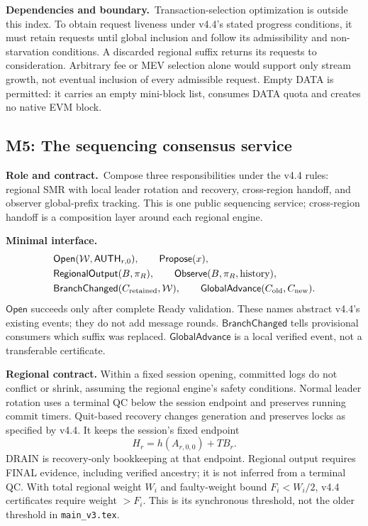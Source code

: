 \documentclass[11pt,a4paper]{article}
\newcommand{\api}[1]{\ensuremath{\mathsf{#1}}}
\newcommand{\TB}{\mathit{TB}}
\newcommand{\role}{\textbf{Role and contract.}\ }
\newcommand{\iface}{\textbf{Minimal interface.}\ }
\newcommand{\depends}{\textbf{Dependencies and boundary.}\ }
\begin{document}
\depends Transaction-selection optimization is outside this index.
To obtain request liveness under v4.4's stated progress conditions, it must
retain requests until global inclusion and follow its admissibility and
non-starvation conditions. A discarded regional suffix returns its
requests to consideration. Arbitrary fee or MEV selection alone would
support only stream growth, not eventual inclusion of every admissible
request. Empty DATA is permitted: it carries an empty mini-block list,
consumes DATA quota and creates no native EVM block.

\subsection{M5: The sequencing consensus service}\label{sec:consensus}
\role Compose three responsibilities under the v4.4 rules: regional
SMR with local leader rotation and recovery, cross-region handoff, and
observer global-prefix tracking. This is one public sequencing service;
cross-region handoff is a composition layer around each regional engine.

\iface
\[
\begin{aligned}
 &\api{Open}(\mathcal W,\api{AUTH}_{r,0}),\qquad \api{Propose}(x),\\
 &\api{RegionalOutput}(B,\pi_R),\qquad
   \api{Observe}(B,\pi_R,\text{history}),\\
 &\api{BranchChanged}(C_{\rm retained},\mathcal W),\qquad
   \api{GlobalAdvance}(C_{\rm old},C_{\rm new}).
\end{aligned}
\]
\api{Open} succeeds only after complete Ready validation. These names
abstract v4.4's existing events; they do not add message rounds.
\api{BranchChanged} tells provisional consumers which suffix was replaced.
\api{GlobalAdvance} is a local verified event, not a transferable
certificate.

\textbf{Regional contract.} Within a fixed session opening, committed
logs do not conflict or shrink, assuming the regional engine's safety
conditions. Normal leader rotation uses a terminal QC below the session
endpoint and preserves running commit timers. Quit-based recovery changes
generation and preserves locks as specified by v4.4. It keeps the
session's fixed endpoint
\[
 H_r=h(A_{r,0,0})+\TB_r.
\]
DRAIN is recovery-only bookkeeping at that endpoint. Regional output
requires FINAL evidence, including verified ancestry; it is not inferred
from a terminal QC. With total regional weight $W_i$ and faulty-weight
bound $F_i<W_i/2$, v4.4 certificates require weight $>F_i$. This is its
synchronous threshold, not the older threshold in \texttt{main\_v3.tex}.
\end{document}
